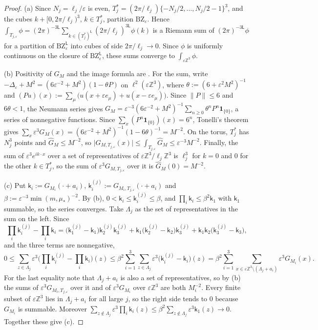 \documentclass[11pt]{amsart}
\theoremstyle{plain}
\theoremstyle{definition}
\theoremstyle{remark}
\numberwithin{equation}{section}
\newcommand{\Z}{\mathbb{Z}}
\newcommand{\eps}{\varepsilon}
\newcommand{\abs}[1]{\lvert #1\rvert}
\newcommand{\norm}[1]{\lVert #1\rVert}
\begin{document}
\begin{proof}
(a) Since $N_j=\ell_j/\eps$ is even, $T_j^*=(2\pi/\ell_j)\{-N_j/2,\dots,N_j/2-1\}^3$, and the cubes $k+[0,2\pi/\ell_j)^3$, $k\in T_j^*$, partition $\mathrm{BZ}_\eps$. Hence $\int_{T_{j,\eps}}\phi=(2\pi)^{-3\mathsf L}\sum_{k\in(T_j^*)^{\mathsf L}}(2\pi/\ell_j)^{3\mathsf L}\phi(k)$ is a Riemann sum of $(2\pi)^{-3\mathsf L}\phi$ for a partition of $\mathrm{BZ}_\eps^{\mathsf L}$ into cubes of side $2\pi/\ell_j\to0$. Since $\phi$ is uniformly continuous on the closure of $\mathrm{BZ}_\eps^{\mathsf L}$, these sums converge to $\int_{\eps\Z^3}\phi$.

(b) Positivity of $G_M$ and the image formula are \cite[Lemma~G.12(a),(b)]{v1}. For the sum, write $-\Delta_\eps+M^2=(6\eps^{-2}+M^2)(1-\theta P)$ on $\ell^2(\eps\Z^3)$, where $\theta:=(6+\eps^2M^2)^{-1}$ and $(Pu)(x):=\sum_\mu\big(u(x+\eps e_\mu)+u(x-\eps e_\mu)\big)$. Since $\norm P\le6$ and $6\theta<1$, the Neumann series gives $G_M=\eps^{-3}(6\eps^{-2}+M^2)^{-1}\sum_{n\ge0}\theta^nP^n\mathbf 1_{\{0\}}$, a series of nonnegative functions. Since $\sum_x(P^n\mathbf 1_{\{0\}})(x)=6^n$, Tonelli's theorem gives $\sum_x\eps^3G_M(x)=(6\eps^{-2}+M^2)^{-1}(1-6\theta)^{-1}=M^{-2}$. On the torus, $T_j^*$ has $N_j^3$ points and $\hat G_M\le M^{-2}$, so $\abs{G_{M,T_{j,\eps}}(x)}\le\int_{T_{j,\eps}}\hat G_M\le\eps^{-3}M^{-2}$. Finally, the sum of $\eps^3e^{ik\cdot x}$ over a set of representatives of $\eps\Z^3/\ell_j\Z^3$ is $\ell_j^3$ for $k=0$ and $0$ for the other $k\in T_j^*$, so the sum of $\eps^3G_{M,T_{j,\eps}}$ over it is $\hat G_M(0)=M^{-2}$.

(c) Put $\mathsf k_i:=G_{M_i}(\cdot+a_i)$, $\mathsf k_i^{(j)}:=G_{M_i,T_{j,\eps}}(\cdot+a_i)$ and $\beta:=\eps^{-3}\min(m,\mu_*)^{-2}$. By (b), $0<\mathsf k_i\le\mathsf k_i^{(j)}\le\beta$, and $\prod_i\mathsf k_i\le\beta^2\mathsf k_1$ with $\mathsf k_1$ summable, so the series converges. Take $\Lambda_j$ as the set of representatives in the sum on the left. Since
\[
\prod_i\mathsf k_i^{(j)}-\prod_i\mathsf k_i=\big(\mathsf k_1^{(j)}-\mathsf k_1\big)\mathsf k_2^{(j)}\mathsf k_3^{(j)}+\mathsf k_1\big(\mathsf k_2^{(j)}-\mathsf k_2\big)\mathsf k_3^{(j)}+\mathsf k_1\mathsf k_2\big(\mathsf k_3^{(j)}-\mathsf k_3\big),
\]
and the three terms are nonnegative,
\[
0\le\sum_{z\in\Lambda_j}\eps^3\Big(\prod_i\mathsf k_i^{(j)}-\prod_i\mathsf k_i\Big)(z)\le\beta^2\sum_{i=1}^3\sum_{z\in\Lambda_j}\eps^3\big(\mathsf k_i^{(j)}-\mathsf k_i\big)(z)=\beta^2\sum_{i=1}^3\sum_{x\in\eps\Z^3\setminus(\Lambda_j+a_i)}\eps^3G_{M_i}(x).
\]
For the last equality note that $\Lambda_j+a_i$ is also a set of representatives, so by (b) the sums of $\eps^3G_{M_i,T_{j,\eps}}$ over it and of $\eps^3G_{M_i}$ over $\eps\Z^3$ are both $M_i^{-2}$. Every finite subset of $\eps\Z^3$ lies in $\Lambda_j+a_i$ for all large $j$, so the right side tends to $0$ because $G_{M_i}$ is summable. Moreover $\sum_{z\notin\Lambda_j}\eps^3\prod_i\mathsf k_i(z)\le\beta^2\sum_{z\notin\Lambda_j}\eps^3\mathsf k_1(z)\to0$. Together these give (c).
\end{proof}
\end{document}
